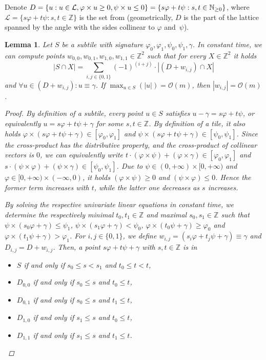 \documentclass[11pt, letterpaper]{article}
\theoremstyle{plain}
\newtheorem{lemma}{Lemma}
\theoremstyle{definition}
\theoremstyle{remark}
\renewcommand{\O}{\mathcal{O}}
\renewcommand{\L}{\mathcal{L}}
\renewcommand{\phi}{\varphi}
\newcommand{\set}[1]{\left\lbrace #1 \right\rbrace}
\newcommand{\absolute}[1]{\left\lvert#1\right\rvert}
\begin{document}
Denote $D = \set{u : u \in \L, \h{u} \ge 0, \s{u} \le 0} = \{ s\phi + t\psi : s,t \in \mathbb N_{\geq 0}\}$, where $\L = \{ s\phi + t\psi : s,t \in \mathbb Z\}$ is the set from  (geometrically, $D$ is the part of the lattice spanned by the angle with the sides collinear to $\phi$ and~$\psi$).

\begin{lemma}\label{primitive}
Let $S$ be a subtile with signature $\phi_0, \phi_1, \psi_0, \psi_1, \gamma$. In constant time, we can compute points $w_{0,0},w_{0,1},w_{1,0},w_{1,1} \in \mathbb Z^2$ such that for every $X \in \mathbb Z^2$ it holds
\[ \absolute{S \cap X} = \sum_{i,j \in \{0,1\}} (-1)^{(i+j)} \cdot \absolute{(D + w_{i,j}) \cap X}\]
and $\forall u \in (D + w_{i,j}) : u \equiv \gamma$. If $\max_{u \in S}(\absolute{u}) = \O(m)$, then $\absolute{w_{i,j}} = \O(m)$.

\begin{proof}
By definition of a subtile, every point $u \in S$ satisfies $u - \gamma = s\phi + t\psi$, or equivalently $u = s\phi + t\psi + \gamma$ for some $s,t\in\mathbb Z$. 
By definition of a tile, it also holds $\phi \times (s\phi + t\psi + \gamma) \in [\phi_0, \phi_1]$ and $\psi \times (s\phi + t\psi + \gamma) \in [\psi_0, \psi_1]$. Since the cross-product has the distributive property, and the cross-product of collinear vectors is $0$, we can equivalently write $t \cdot (\phi \times \psi) + (\phi \times \gamma) \in [\phi_0, \phi_1]$ and $s \cdot (\psi \times \phi) + (\psi \times \gamma) \in [\psi_0, \psi_1]$. 
Due to $\psi \in (0, +\infty) \times [0, +\infty)$ and $\phi \in [0, +\infty) \times (-\infty, 0)$, it holds $(\phi \times \psi) \geq 0$ and $(\psi \times \phi) \leq 0$. Hence the former term increases with $t$, while the latter one decreases as $s$ increases.

By solving the respective univariate linear equations in constant time, we determine the respectively minimal $t_0, t_1 \in \mathbb Z$ and maximal $s_0, s_1 \in \mathbb Z$ such that $\psi \times (s_0\phi + \gamma) \leq \psi_1$, $\psi \times (s_1\phi + \gamma) < \psi_0$, $\phi \times (t_0\psi + \gamma) \geq \phi_0$ and $\phi \times (t_1\psi + \gamma) > \phi_1$.
For $i,j \in \{0, 1\}$, we define $w_{i, j} = (s_i\phi + t_j\psi + \gamma) \equiv \gamma$ and $D_{i,j} = D + w_{i,j}$. 
Then, a point $s\phi + t\psi + \gamma$ with $s,t \in \mathbb Z$ is in 
\begin{itemize}
	\item $S$ if and only if $s_0 \leq s < s_1$ and $t_0 \leq t < t$, 
	\item $D_{0, 0}$ if and only if $s_0 \leq s$ and $t_0 \leq t$, 
	\item $D_{0, 1}$ if and only if $s_0 \leq s$ and $t_1 \leq t$, 
	\item $D_{1, 0}$ if and only if $s_1 \leq s$ and $t_0 \leq t$, 
	\item $D_{1, 1}$ if and only if $s_1 \leq s$ and $t_1 \leq t$.
\end{itemize}


\end{proof}
\end{lemma}
\end{document}
